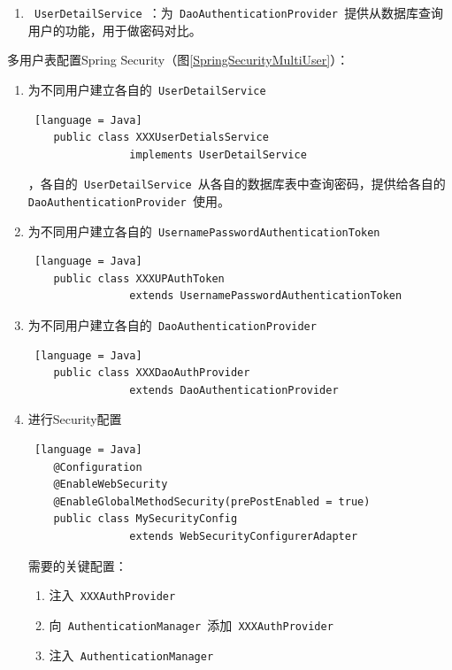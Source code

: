 \begin{enumerate}
\begin{enumerate}
          \item \lstinline[language = Java]| UserDetailService |：为\lstinline[language = Java]| DaoAuthenticationProvider |提供从数据库查询用户的功能，用于做密码对比。
        \end{enumerate}
        多用户表配置Spring Security（图\ref{SpringSecurityMultiUser}）：
        \begin{enumerate}
          \item 为不同用户建立各自的\lstinline[language = Java]| UserDetailService |
                \begin{lstlisting} [language = Java]
    public class XXXUserDetialsService 
                implements UserDetailService
                \end{lstlisting}
                ，各自的\lstinline[language = Java]| UserDetailService |从各自的数据库表中查询密码，提供给各自的\lstinline[language = Java]| DaoAuthenticationProvider |使用。
          \item 为不同用户建立各自的\lstinline[language = Java]| UsernamePasswordAuthenticationToken | \begin{lstlisting} [language = Java]
    public class XXXUPAuthToken 
                extends UsernamePasswordAuthenticationToken
              \end{lstlisting}
          \item 为不同用户建立各自的\lstinline[language = Java]| DaoAuthenticationProvider | \begin{lstlisting} [language = Java]
    public class XXXDaoAuthProvider 
                extends DaoAuthenticationProvider
              \end{lstlisting}
          \item 进行Security配置 \begin{lstlisting} [language = Java]
    @Configuration
    @EnableWebSecurity
    @EnableGlobalMethodSecurity(prePostEnabled = true)
    public class MySecurityConfig 
                extends WebSecurityConfigurerAdapter 
              \end{lstlisting}
                需要的关键配置：\begin{enumerate}
                  \item 注入\lstinline[language = Java]| XXXAuthProvider |
                  \item 向\lstinline[language = Java]| AuthenticationManager |添加\lstinline[language = Java]| XXXAuthProvider |
                  \item 注入\lstinline[language = Java]| AuthenticationManager |

\end{enumerate}
\end{enumerate}
\end{enumerate}

